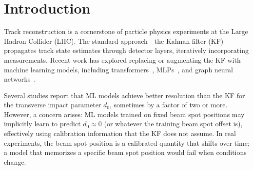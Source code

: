 \documentclass[11pt]{article}
\begin{document}
\section{Introduction}
\label{sec:intro}

Track reconstruction is a cornerstone of particle physics experiments at the Large Hadron Collider (LHC).
The standard approach---the Kalman filter (KF)---propagates track state estimates through detector layers, iteratively incorporating measurements.
Recent work has explored replacing or augmenting the KF with machine learning models, including transformers~\cite{trackformers1,trackformers2}, MLPs~\cite{fasttrackfitting}, and graph neural networks~\cite{maskformer}.

Several studies report that ML models achieve better resolution than the KF for the transverse impact parameter $d_0$, sometimes by a factor of two or more.
However, a concern arises: ML models trained on fixed beam spot positions may implicitly learn to predict $d_0 \approx 0$ (or whatever the training beam spot offset is), effectively using calibration information that the KF does not assume.
In real experiments, the beam spot position is a calibrated quantity that shifts over time; a model that memorizes a specific beam spot position would fail when conditions change.
\end{document}
